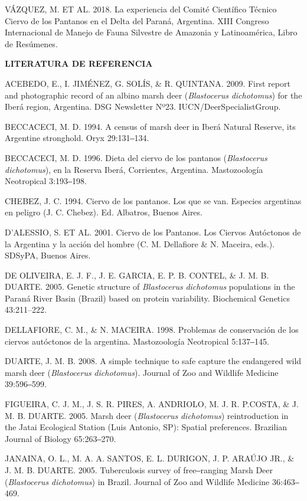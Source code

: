 \documentclass[
  x11names]{article}
\begin{document}
VÁZQUEZ, M. ET AL. 2018. La experiencia del Comité Científico Técnico
Ciervo de los Pantanos en el Delta del Paraná, Argentina. XIII Congreso
Internacional de Manejo de Fauna Silvestre de Amazonia y Latinoamérica,
Libro de Resúmenes.

\noindent\textbf{LITERATURA DE REFERENCIA}

ACEBEDO, E., I. JIMÉNEZ, G. SOLÍS, \& R. QUINTANA. 2009. First report
and photographic record of an albino marsh deer (\textit{Blastocerus}
\textit{dichotomus}) for the Iberá region, Argentina. DSG Newsletter
Nº23. IUCN/DeerSpecialistGroup.

BECCACECI, M. D. 1994. A census of marsh deer in Iberá Natural Reserve,
its Argentine stronghold. Oryx 29:131‒134.

BECCACECI, M. D. 1996. Dieta del ciervo de los pantanos
(\textit{Blastocerus} \textit{dichotomus}), en la Reserva Iberá,
Corrientes, Argentina. Mastozoología Neotropical 3:193‒198.

CHEBEZ, J. C. 1994. Ciervo de los pantanos. Los que se van. Especies
argentinas en peligro (J. C. Chebez). Ed. Albatros, Buenos Aires.

D'ALESSIO, S. ET AL. 2001. Ciervo de los Pantanos. Los Ciervos
Autóctonos de la Argentina y la acción del hombre (C. M. Dellafiore \&
N. Maceira, eds.). SDSyPA, Buenos Aires.

DE OLIVEIRA, E. J. F., J. E. GARCIA, E. P. B. CONTEL, \& J. M. B.
DUARTE. 2005. Genetic structure of \textit{Blastocerus}
\textit{dichotomus} populations in the Paraná River Basin (Brazil) based
on protein variability. Biochemical Genetics 43:211--222.

DELLAFIORE, C. M., \& N. MACEIRA. 1998. Problemas de conservación de los
ciervos autóctonos de la argentina. Mastozoología Neotropical 5:137‒145.

DUARTE, J. M. B. 2008. A simple technique to safe capture the endangered
wild marsh deer (\textit{Blastocerus} \textit{dichotomus}). Journal of
Zoo and Wildlife Medicine 39:596‒599.

FIGUEIRA, C. J. M., J. S. R. PIRES, A. ANDRIOLO, M. J. R. P.COSTA, \& J.
M. B. DUARTE. 2005. Marsh deer (\textit{Blastocerus}
\textit{dichotomus}) reintroduction in the Jatai Ecological Station
(Luis Antonio, SP): Spatial preferences. Brazilian Journal of Biology
65:263‒270.

JANAINA, O. L., M. A. A. SANTOS, E. L. DURIGON, J. P. ARAÚJO JR., \& J.
M. B. DUARTE. 2005. Tuberculosis survey of free‒ranging Marsh Deer
(\textit{Blastocerus} \textit{dichotomus}) in Brazil. Journal of Zoo and
Wildlife Medicine 36:463‒469.
\end{document}
